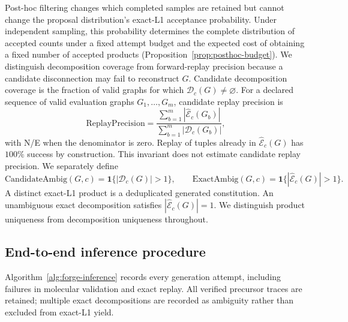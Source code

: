 \documentclass{article}
\theoremstyle{definition}
\begin{document}
Post-hoc filtering changes which completed samples are retained but cannot change the proposal
distribution's exact-L1 acceptance probability.
Under independent sampling, this probability determines the complete distribution of accepted
counts under a fixed attempt budget and the expected cost of obtaining a fixed number of accepted
products (Proposition~\ref{prop:posthoc-budget}).
We distinguish decomposition coverage from forward-replay precision because a candidate disconnection
may fail to reconstruct $G$.
Candidate decomposition coverage is the fraction of valid graphs for which
$\mathcal D_c(G)\neq\varnothing$. For a declared sequence of valid evaluation graphs $G_1,\ldots,G_m$, candidate replay precision is
\begin{equation}
 \mathrm{ReplayPrecision}
 =\frac{\sum_{b=1}^m|\widehat{\mathcal E}_c(G_b)|}
 {\sum_{b=1}^m|\mathcal D_c(G_b)|},
\end{equation}
with N/E when the denominator is zero. Replay of tuples already in
$\widehat{\mathcal E}_c(G)$ has $100\%$ success by construction. This invariant does not estimate
candidate replay precision. We separately define
\begin{equation}
 \mathrm{CandidateAmbig}(G,c)=\mathbf 1\{|\mathcal D_c(G)|>1\},\qquad
 \mathrm{ExactAmbig}(G,c)=\mathbf 1\{|\widehat{\mathcal E}_c(G)|>1\}.
\end{equation}
A distinct exact-L1 product is a deduplicated generated constitution. An unambiguous exact
decomposition satisfies $|\widehat{\mathcal E}_c(G)|=1$. We distinguish product uniqueness from
decomposition uniqueness throughout.

\subsection{End-to-end inference procedure}
\label{app:inference}

Algorithm~\ref{alg:forge-inference} records every generation attempt, including failures in
molecular validation and exact replay. All verified precursor traces are retained; multiple exact
decompositions are recorded as ambiguity rather than excluded from exact-L1 yield.
\end{document}
